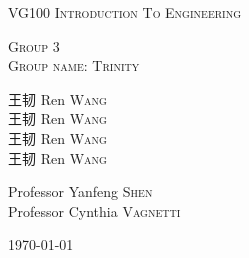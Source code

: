 
\begin{center}
\vspace*{0.7in}
\vspace*{0.7in}






\begin{center} 

{
\linespread{2}
\huge
\textsc{VG100 Introduction To Engineering} \\
}

\vspace*{0.7in}

\textsc{Group 3}\\
\textsc{Group name: Trinity}\\

\vspace*{0.7in}

{\selectfont 王韧} Ren \textsc{Wang} \\
{\selectfont 王韧} Ren \textsc{Wang} \\
{\selectfont 王韧} Ren \textsc{Wang} \\
{\selectfont 王韧} Ren \textsc{Wang} \\

\vspace*{0.7in}

Professor \phantom{iia}  Yanfeng \textsc{Shen} \phantom{i}\\
Professor \phantom{a} Cynthia \textsc{Vagnetti} 


{\today}


\end{center}



\end{center}
\newpage
